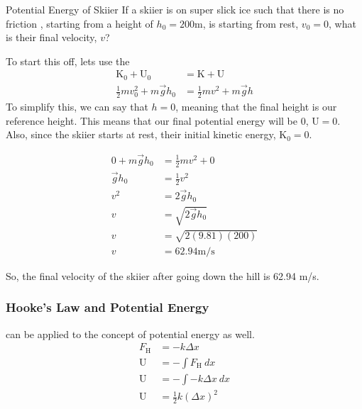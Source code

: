 \begin{example}[]{Potential Energy of Skiier}
  If a skiier is on super slick ice such that there is no friction , starting from a height of $h_{0}=200 \si{\meter}$, is starting from rest, $v_{0} = 0$, what is their final velocity, $v$?

  \tcblower

  To start this off, lets use the 
  \begin{align*}
    \text{K}_{0} + \text{U}_{0} &= \text{K} + \text{U} \\
    \frac{1}{2} m v_{0}^{2} + m \vec{g} h_{0} &= \frac{1}{2} m v^{2} + m \vec{g} h
  \end{align*}
  To simplify this, we can say that $h=0$, meaning that the final height is our reference height.
  This means that our final potential energy will be 0, $\text{U} = 0$.
  Also, since the skiier starts at rest, their initial kinetic energy, $\text{K}_{0} = 0$.

  \begin{align*}
    0 + m \vec{g} h_{0} &= \frac{1}{2} m v^{2} + 0 \\
    \vec{g} h_{0} &= \frac{1}{2} v^{2} \\
    v^{2} &= 2 \vec{g} h_{0} \\
    v &= \sqrt{2 \vec{g} h_{0}} \\
    v &= \sqrt{2 (9.81) (200)} \\
    v &= 62.94 \si{\meter / \second}
  \end{align*}

  So, the final velocity of the skiier after going down the hill is 62.94 \si{\meter / \second}.
\end{example}

\subsubsection{Hooke's Law and Potential Energy}\label{subsubsec:Hookes Law and Potential Energy}
 can be applied to the concept of potential energy as well.
\begin{align*}
  F_{\text{H}} &= -k \Delta x \\
  \text{U} &= - \int F_{\text{H}} \: dx \\
  \text{U} &= - \int -k \Delta x \: dx \\
  \text{U} &= \frac{1}{2} k \left( \Delta x \right)^{2}
\end{align*}


